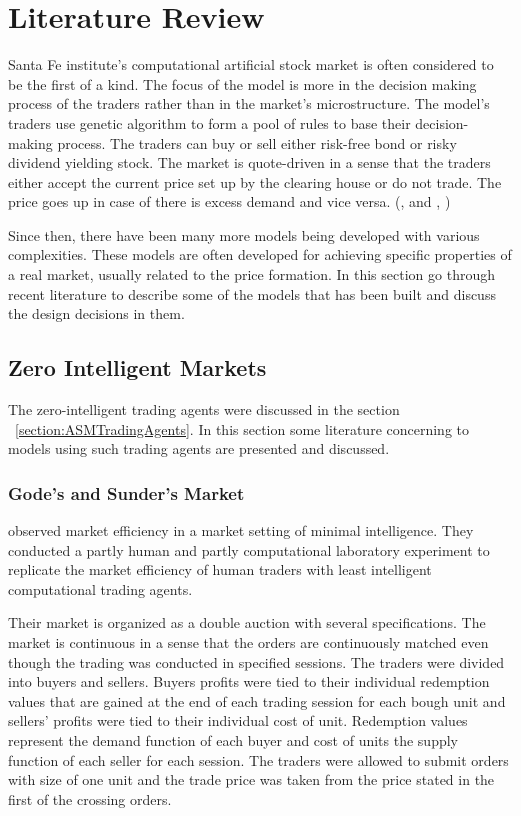 \section{Literature Review}

Santa Fe institute's computational artificial stock 
market is often considered to be the first of a kind. 
The focus of the model is more in the 
decision making process of the traders rather than in the 
market's microstructure. The model's traders use 
genetic algorithm to form a pool of rules to base
their decision-making process. The traders can buy or
sell either risk-free bond or risky dividend yielding stock.
The market is quote-driven in a sense that the traders
either accept the current price set up by the clearing house
or do not trade. The price goes up in case of there is excess
demand and vice versa. (\citeauthor{SantaFe94}, \citeyear{SantaFe94} 
and \citeauthor{SantaFe99}, \citeyear{SantaFe99})

Since then, there have been many more models being 
developed with various complexities. These models are often developed
for achieving specific properties of a real market, 
usually related to the price formation. In this section
go through recent literature to describe some of the models
that has been built and discuss the design decisions in them.



\subsection{Zero Intelligent Markets}


The zero-intelligent trading agents were discussed in the section 
~\ref{section:ASMTradingAgents}. In this section some literature
concerning to models using such trading agents are presented and
discussed.

\subsubsection{Gode's and Sunder's Market}
\citet{God93} observed market efficiency in a market setting
of minimal intelligence. They conducted a partly human and partly
computational laboratory experiment to replicate the market
efficiency of human traders with least intelligent computational
trading agents.

Their market is organized as a double auction with several
specifications. The market is continuous in a sense that the 
orders are continuously matched even though the trading was
conducted in specified sessions. The traders were divided 
into buyers and sellers. Buyers profits were tied to their 
individual redemption values that are gained at the end of
each trading session for each bough unit and sellers' profits
were tied to their individual cost of unit. Redemption values
represent the demand function of each buyer and cost of units 
the supply function of each seller for each session. The
traders were allowed to submit orders with size of one unit
and the trade price was taken from the price stated in the 
first of the crossing orders.

